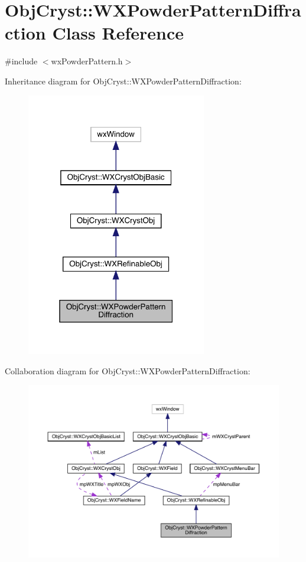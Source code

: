 \hypertarget{class_obj_cryst_1_1_w_x_powder_pattern_diffraction}{}\section{Obj\+Cryst\+::W\+X\+Powder\+Pattern\+Diffraction Class Reference}
\label{class_obj_cryst_1_1_w_x_powder_pattern_diffraction}


{\ttfamily \#include $<$wx\+Powder\+Pattern.\+h$>$}



Inheritance diagram for Obj\+Cryst\+::W\+X\+Powder\+Pattern\+Diffraction\+:
\nopagebreak
\begin{figure}[H]
\begin{center}
\leavevmode
\includegraphics[width=223pt]{class_obj_cryst_1_1_w_x_powder_pattern_diffraction__inherit__graph}
\end{center}
\end{figure}


Collaboration diagram for Obj\+Cryst\+::W\+X\+Powder\+Pattern\+Diffraction\+:
\nopagebreak
\begin{figure}[H]
\begin{center}
\leavevmode
\includegraphics[width=350pt]{class_obj_cryst_1_1_w_x_powder_pattern_diffraction__coll__graph}
\end{center}
\end{figure}
